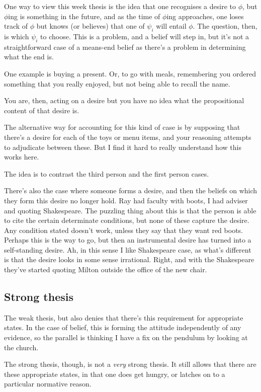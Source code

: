\documentclass[10pt]{article}
\begin{document}
One way to view this week thesis is the idea that one recognises a desire to \(\phi\), but \(\phi\)ing is something in the future, and as the time of \(\phi\)ing approaches, one loses track of \(\phi\) but knows (or believes) that one of \(\psi_{i}\) will entail \(\phi\).
The question, then, is which \(\psi_{i}\) to choose.
This is a problem, and a belief will step in, but it's not a straightforward case of a means-end belief as there's a problem in determining what the end is.

One example is buying a present.
Or, to go with meals, remembering you ordered something that you really enjoyed, but not being able to recall the name.

You are, then, acting on a desire but you have no idea what the propositional content of that desire is.

The alternative way for accounting for this kind of case is by supposing that there's a desire for each of the toys or menu items, and your reasoning attempts to adjudicate between these.
But I find it hard to really understand how this works here.

The idea is to contrast the third person and the first person cases.

There's also the case where someone forms a desire, and then the beliefs on which they form this desire no longer hold.
Ray had faculty with boots, I had adviser and quoting Shakespeare.
The puzzling thing about this is that the person is able to cite the certain determinate conditions, but none of these capture the desire.
Any condition stated doesn't work, unless they say that they want red boots.
Perhaps this is the way to go, but then an instrumental desire has turned into a self-standing desire.
Ah, in this sense I like Shakespeare case, as what's different is that the desire looks in some sense irrational.
Right, and with the Shakespeare they've started quoting Milton outside the office of the new chair.

\subsection{Strong thesis}
\label{sec:strong-thesis}


The weak thesis, but also denies that there's this requirement for appropriate states.
In the case of belief, this is forming the attitude independently of any evidence, so the parallel is thinking I have a fix on the pendulum by looking at the church.

The strong thesis, though, is not a \emph{very} strong thesis.
It still allows that there are these appropriate states, in that one does get hungry, or latches on to a particular normative reason.
\end{document}
